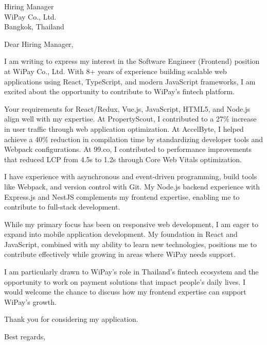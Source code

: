 \documentclass[11pt,a4paper]{letter}
\begin{document}
\begin{letter}{
    Hiring Manager \\
    WiPay Co., Ltd. \\
    Bangkok, Thailand
}

\opening{Dear Hiring Manager,}

I am writing to express my interest in the Software Engineer (Frontend) position at WiPay Co., Ltd. With 8+ years of experience building scalable web applications using React, TypeScript, and modern JavaScript frameworks, I am excited about the opportunity to contribute to WiPay's fintech platform.

Your requirements for React/Redux, Vue.js, JavaScript, HTML5, and Node.js align well with my expertise. At PropertyScout, I contributed to a 27\% increase in user traffic through web application optimization. At AccelByte, I helped achieve a 40\% reduction in compilation time by standardizing developer tools and Webpack configurations. At 99.co, I contributed to performance improvements that reduced LCP from 4.5s to 1.2s through Core Web Vitals optimization.

I have experience with asynchronous and event-driven programming, build tools like Webpack, and version control with Git. My Node.js backend experience with Express.js and NestJS complements my frontend expertise, enabling me to contribute to full-stack development.

While my primary focus has been on responsive web development, I am eager to expand into mobile application development. My foundation in React and JavaScript, combined with my ability to learn new technologies, positions me to contribute effectively while growing in areas where WiPay needs support.

I am particularly drawn to WiPay's role in Thailand's fintech ecosystem and the opportunity to work on payment solutions that impact people's daily lives. I would welcome the chance to discuss how my frontend expertise can support WiPay's growth.

Thank you for considering my application.

\closing{Best regards,}

\end{letter}
\end{document}
